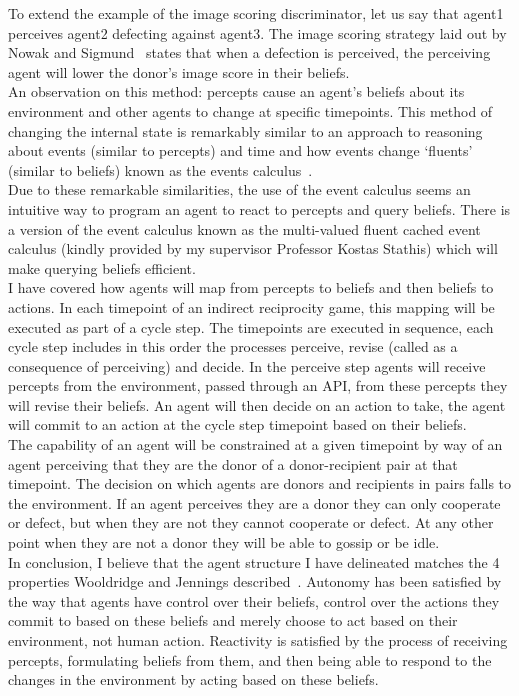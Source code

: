 \documentclass[twoside,twocolumn]{article}
\begin{document}
To extend the example of the image scoring discriminator, let us say that agent1 perceives agent2 defecting against agent3. The image scoring strategy laid out by Nowak and Sigmund~\cite{evol_indirect_image} states that when a defection is perceived, the perceiving agent will lower the donor's image score in their beliefs.\\
An observation on this method: percepts cause an agent's beliefs about its environment and other agents to change at specific timepoints. This method of changing the internal state is remarkably similar to an approach to reasoning about events (similar to percepts) and time and how events change `fluents' (similar to beliefs) known as the events calculus~\cite{kowalski1989logic}.\\
Due to these remarkable similarities, the use of the event calculus seems an intuitive way to program an agent to react to percepts and query beliefs. There is a version of the event calculus known as the multi-valued fluent cached event calculus (kindly provided by my supervisor Professor Kostas Stathis) which will make querying beliefs efficient.\\
I have covered how agents will map from percepts to beliefs and then beliefs to actions. In each timepoint of an indirect reciprocity game, this mapping will be executed as part of a cycle step. The timepoints are executed in sequence, each cycle step includes in this order the processes perceive, revise (called as a consequence of perceiving) and decide. In the perceive step agents will receive percepts from the environment, passed through an API, from these percepts they will revise their beliefs. An agent will then decide on an action to take, the agent will commit to an action at the cycle step timepoint based on their beliefs.\\
The capability of an agent will be constrained at a given timepoint by way of an agent perceiving that they are the donor of a donor-recipient pair at that timepoint. The decision on which agents are donors and recipients in pairs falls to the environment. If an agent perceives they are a donor they can only cooperate or defect, but when they are not they cannot cooperate or defect. At any other point when they are not a donor they will be able to gossip or be idle.\\
In conclusion, I believe that the agent structure I have delineated matches the 4 properties Wooldridge and Jennings described~\cite{wooldridge_jennings_1995}. Autonomy has been satisfied by the way that agents have control over their beliefs, control over the actions they commit to based on these beliefs and merely choose to act based on their environment, not human action. Reactivity is satisfied by the process of receiving percepts, formulating beliefs from them, and then being able to respond to the changes in the environment by acting based on these beliefs.\\
\end{document}
